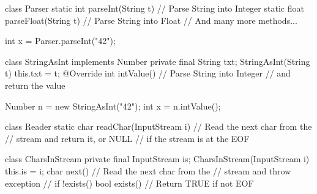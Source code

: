 \documentclass{article}
\begin{document}

\pptToc



\begin{pptWide}{2}
{\small\begin{ffcode}
class Parser {
  static int parseInt(String t) {
    // Parse String into Integer
  }
  static float parseFloat(String t) {
    // Parse String into Float
  }
  // And many more methods...
}

int x = Parser.parseInt("42");
\end{ffcode}
}
\par\columnbreak\par
{\small\begin{ffcode}
class StringAsInt implements Number {
  private final String txt;
  StringAsInt(String t) { this.txt = t; }
  @Override int intValue() {
    // Parse String into Integer
    // and return the value
  }
}

Number n = new StringAsInt("42");
int x = n.intValue();
\end{ffcode}
}
\end{pptWide}
\par
\plush{}

\begin{pptWide}{2}
{\small\begin{ffcode}
class Reader {
  static char readChar(InputStream i) {
    // Read the next char from the
    // stream and return it, or NULL
    // if the stream is at the EOF
  }
}
\end{ffcode}
}
\par\columnbreak\par
{\small\begin{ffcode}
class CharsInStream {
  private final InputStream is;
  CharsInStream(InputStream i) { this.is = i; }
  char next() {
    // Read the next char from the
    // stream and throw exception
    // if !exists()
  }
  bool exists() {
    // Return TRUE if not EOF
  }
}
\end{ffcode}
}
\end{pptWide}
\par
\plush{}
\end{document}
